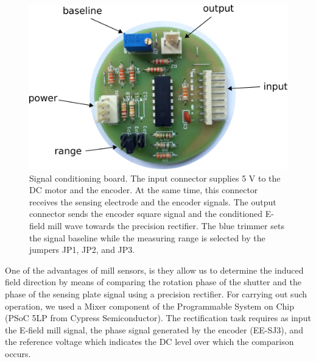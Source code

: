 \documentclass[a4paper]{jpconf}
\begin{document}
\begin{figure}[h]
\includegraphics[width=.55\textwidth]{Figures/Condit.eps}\hspace{2pc}
\begin{minipage}[b]{14pc}\caption{\label{condit} Signal conditioning board. The input connector supplies 5 V to the DC motor and the encoder. At the same time, this connector receives the sensing electrode and the encoder signals. The output connector sends the encoder square signal and the conditioned E-field mill wave towards the precision rectifier. The blue trimmer sets the signal baseline while the measuring range is selected by the jumpers JP1, JP2, and JP3. }
\end{minipage}
\end{figure}

One of the advantages of mill sensors, is they allow us to determine the induced field direction by means of comparing the rotation phase of the shutter and the phase of the sensing plate signal using a precision rectifier. For carrying out such operation, we used a Mixer component of the Programmable System on Chip (PSoC 5LP from Cypress Semiconductor). The rectification task requires as input the E-field mill signal, the phase signal generated by the encoder (EE-SJ3), and the reference voltage which indicates the DC level over which the comparison occurs.
\end{document}
